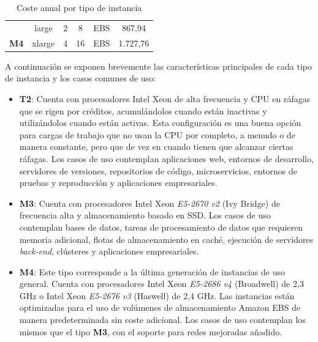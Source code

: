 \begin{table}
\begin{tabular}{cccccc}
\multicolumn{1}{|c|}{\cellcolor[HTML]{EFEFEF}}                              & \multicolumn{1}{c|}{large}                                   & \multicolumn{1}{c|}{2}                                    & \multicolumn{1}{c|}{8}                                                                                      & \multicolumn{1}{c|}{EBS}                                                                                          & \multicolumn{1}{c|}{867,94}                                                                             \\ \cline{2-6} 
\multicolumn{1}{|c|}{\multirow{-2}{*}{\cellcolor[HTML]{EFEFEF}\textbf{M4}}} & \multicolumn{1}{c|}{xlarge}                                  & \multicolumn{1}{c|}{4}                                    & \multicolumn{1}{c|}{16}                                                                                     & \multicolumn{1}{c|}{EBS}                                                                                          & \multicolumn{1}{c|}{1.727,76}                                                                           \\ \hline
                                                                          
\end{tabular}
\caption{Coste anual por tipo de instancia \label{tab:costeinstancia}}
\end{table}

A continuación se exponen brevemente las características principales de cada tipo de instancia y los casos comunes de uso:

\begin{itemize}
\item \textbf{T2}: Cuenta con procesadores Intel Xeon de alta frecuencia y CPU en ráfagas que se rigen por créditos, acumulándolos cuando están inactivas y utilizándolos cuando están activas. Esta configuración es una buena opción para cargas de trabajo que no usan la CPU por completo, a menudo o de manera constante, pero que de vez en cuando tienen que alcanzar ciertas ráfagas. Los casos de uso contemplan aplicaciones web, entornos de desarrollo, servidores de versiones, repositorios de código, microservicios, entornos de pruebas y reproducción y aplicaciones empresariales.
\item \textbf{M3}: Cuenta con procesadores Intel Xeon \textit{E5-2670 v2} (Ivy Bridge) de frecuencia alta y almacenamiento basado en SSD. Los casos de uso contemplan bases de datos, tareas de procesamiento de datos que requieren memoria adicional, flotas de almacenamiento en caché, ejecución de servidores \textit{back-end}, clústeres y aplicaciones empresariales.
\item \textbf{M4}: Este tipo corresponde a la última generación de instancias de uso general. Cuenta con procesadores Intel Xeon \textit{E5-2686 v4} (Broadwell) de 2,3 GHz o Intel Xeon \textit{E5-2676 v3} (Haswell) de 2,4 GHz. Las instancias están optimizadas para el uso de volúmenes de almacenamiento Amazon EBS de manera predeterminada sin coste adicional. Los casos de uso contemplan los mismos que el tipo \textbf{M3}, con el soporte para redes mejoradas añadido.
\end{itemize}

